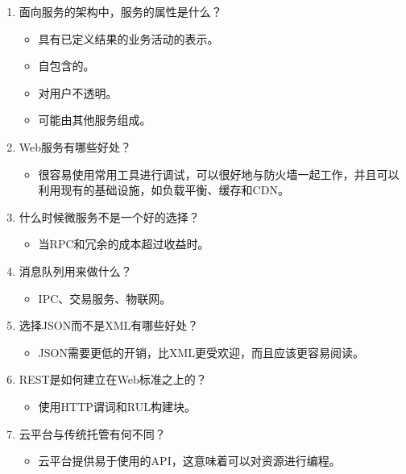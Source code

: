 \begin{enumerate}
\item
面向服务的架构中，服务的属性是什么？
\begin{itemize}
\item 
具有已定义结果的业务活动的表示。

\item 
自包含的。

\item 
对用户不透明。

\item 
可能由其他服务组成。
\end{itemize}

\item
Web服务有哪些好处？
\begin{itemize}
\item 
很容易使用常用工具进行调试，可以很好地与防火墙一起工作，并且可以利用现有的基础设施，如负载平衡、缓存和CDN。
\end{itemize}

\item
什么时候微服务不是一个好的选择？
\begin{itemize}
\item 
当RPC和冗余的成本超过收益时。
\end{itemize}

\item
消息队列用来做什么？
\begin{itemize}
\item 
IPC、交易服务、物联网。
\end{itemize}

\item
选择JSON而不是XML有哪些好处？
\begin{itemize}
\item 
JSON需要更低的开销，比XML更受欢迎，而且应该更容易阅读。
\end{itemize}

\item
REST是如何建立在Web标准之上的？
\begin{itemize}
\item 
使用HTTP谓词和RUL构建块。
\end{itemize}

\item
云平台与传统托管有何不同？
\begin{itemize}
\item 
云平台提供易于使用的API，这意味着可以对资源进行编程。
\end{itemize}
\end{enumerate}